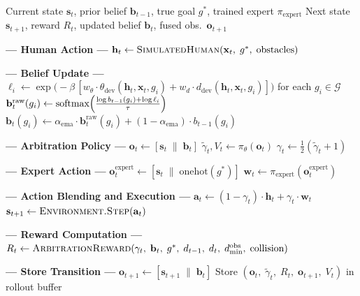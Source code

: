 \documentclass[11pt]{article}
\newcommand{\bvec}{\mathbf{b}_t}
\newcommand{\svec}{\mathbf{s}_t}
\newcommand{\hvec}{\mathbf{h}_t}
\newcommand{\wvec}{\mathbf{w}_t}
\newcommand{\avec}{\mathbf{a}_t}
\newcommand{\goalset}{\mathcal{G}}
\begin{document}
\begin{algorithm}[h]
\caption{BRACE: single-timestep execution during arbitration training}
\label{alg:brace-step}
\begin{algorithmic}[1]
\Require Current state $\svec$, prior belief $\mathbf{b}_{t-1}$, true goal $g^*$, trained expert $\pi_{\text{expert}}$
\Ensure Next state $\mathbf{s}_{t+1}$, reward $R_t$, updated belief $\bvec$, fused obs.\ $\mathbf{o}_{t+1}$

\Statex \textbf{--- Human Action ---}
\State $\hvec \gets \textsc{SimulatedHuman}(\mathbf{x}_t,\; g^*,\; \text{obstacles})$

\Statex \textbf{--- Belief Update ---}
\State $\ell_i \gets \exp\bigl(-\beta\,[w_\theta \cdot \theta_{\text{dev}}(\hvec, \mathbf{x}_t, g_i) + w_d \cdot d_{\text{dev}}(\hvec, \mathbf{x}_t, g_i)]\bigr)$ \quad for each $g_i \in \goalset$
\State $\bvec^{\text{raw}}(g_i) \gets \text{softmax}\Bigl(\frac{\log b_{t-1}(g_i) + \log \ell_i}{\tau}\Bigr)$
\State $\bvec(g_i) \gets \alpha_{\text{ema}} \cdot \bvec^{\text{raw}}(g_i) + (1 - \alpha_{\text{ema}}) \cdot b_{t-1}(g_i)$

\Statex \textbf{--- Arbitration Policy ---}
\State $\mathbf{o}_t \gets [\svec \;\|\; \bvec]$
\State $\tilde{\gamma}_t, V_t \gets \pi_\theta(\mathbf{o}_t)$
\State $\gamma_t \gets \tfrac{1}{2}(\tilde{\gamma}_t + 1)$

\Statex \textbf{--- Expert Action ---}
\State $\mathbf{o}_t^{\text{expert}} \gets [\svec \;\|\; \text{onehot}(g^*)]$
\State $\wvec \gets \pi_{\text{expert}}(\mathbf{o}_t^{\text{expert}})$

\Statex \textbf{--- Action Blending and Execution ---}
\State $\avec \gets (1 - \gamma_t) \cdot \hvec + \gamma_t \cdot \wvec$
\State $\mathbf{s}_{t+1} \gets \textsc{Environment.Step}(\avec)$

\Statex \textbf{--- Reward Computation ---}
\State $R_t \gets \textsc{ArbitrationReward}(\gamma_t,\; \bvec,\; g^*,\; d_{t-1},\; d_t,\; d_{\min}^{\text{obs}},\; \text{collision})$

\Statex \textbf{--- Store Transition ---}
\State $\mathbf{o}_{t+1} \gets [\mathbf{s}_{t+1} \;\|\; \bvec]$
\State Store $(\mathbf{o}_t,\; \tilde{\gamma}_t,\; R_t,\; \mathbf{o}_{t+1},\; V_t)$ in rollout buffer
\end{algorithmic}
\end{algorithm}
\end{document}
